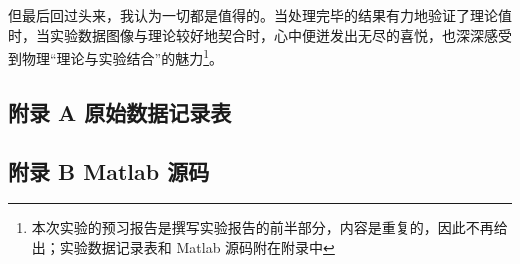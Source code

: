 \documentclass[UTF8]{article}
\theoremstyle{MyLineTheoremStyle} %
\theoremstyle{MyBlockTheoremStyle} %
\theoremstyle{MySubsubsectionStyle} %
\begin{document}
但最后回过头来，我认为一切都是值得的。当处理完毕的结果有力地验证了理论值时，当实验数据图像与理论较好地契合时，心中便迸发出无尽的喜悦，也深深感受到物理“理论与实验结合”的魅力\footnote{本次实验的预习报告是撰写实验报告的前半部分，内容是重复的，因此不再给出；实验数据记录表和 Matlab 源码附在附录中}。












\newpage
\subsection*{附录 A\hspace*{20pt} 原始数据记录表}
\thispagestyle{fancy} 

\begin{figure}[H]\centering
    
\end{figure}


\subsection*{附录 B\hspace*{20pt} Matlab 源码}
\thispagestyle{fancy} 

\end{document}
